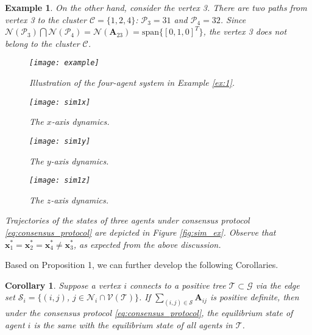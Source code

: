\documentclass[draftclsnofoot,11pt,onecolumn]{IEEEtran}
\newtheorem{Corollary}{Corollary}
\newtheorem{Example}{Example}
\newcommand{\m}[1]{\mathbf{#1}}
\newcommand{\mc}[1]{\mathcal{#1}}
\begin{document}
\begin{Example}
On the other hand, consider the vertex 3. There are two paths from vertex 3 to the cluster $\mc{C} = \{1, 2, 4\}$: $\mc{P}_3 = 31$ and $\mc{P}_4 = 32$. Since $\mc{N}(\mc{P}_3) \bigcap \mc{N}(\mc{P}_4) = \mc{N}(\m{A}_{23}) = \text{span} \{ [0,1,0]^T \}$, the vertex 3 does not belong to the cluster $\mc{C}$.
\begin{figure}[t]
\centering
\texttt{[image: example]}
\caption{Illustration of the four-agent system in Example \ref{ex:1}.}
\label{fig:ex1}
\end{figure}
\begin{figure*}[ht!]
    \begin{subfigure}[b]{0.33\textwidth}
    \centering
    \texttt{[image: sim1x]}
    \caption{The $x$-axis dynamics.}
    \label{fig:sim-exp1}
    \end{subfigure}
    \begin{subfigure}[b]{0.33\textwidth}
    \centering
    \texttt{[image: sim1y]}
    \caption{The $y$-axis dynamics.}
    \label{fig:sim-exp2}
    \end{subfigure}    
    \begin{subfigure}[b]{0.33\textwidth}
    \centering
    \texttt{[image: sim1z]}
    \caption{The $z$-axis dynamics.}
    \label{fig:sim-exp3}
    \end{subfigure}
    \caption{Simulation: The states' dynamics of four agents under the consensus protocol \eqref{eq:consensus_protocol}.}
    \label{fig:sim_ex}
\end{figure*}
Trajectories of the states of three agents under consensus protocol \eqref{eq:consensus_protocol} are depicted in Figure \ref{fig:sim_ex}.  Observe that $\m{x}_1^* = \m{x}_2^* = \m{x}_4^* \neq \m{x}_3^*$, as expected from the above discussion.
\end{Example}

Based on Proposition 1, we can further develop the following Corollaries.


\begin{Corollary} \label{cor:tree-expansion} Suppose a vertex $i$ connects to a positive tree $\mc{T} \subset \mc{G}$ via the edge set $\mc{S}_i = \{(i,j)$, $j \in \mc{N}_i \cap \mc{V}(\mc{T})\}$. If $\sum_{(i,j) \in \mc{S}} \m{A}_{ij}$ is positive definite, then under the consensus protocol \eqref{eq:consensus_protocol}, the equilibrium state of agent $i$ is the same with the equilibrium state of all agents in $\mc{T}$. 
\end{Corollary}
\end{document}

